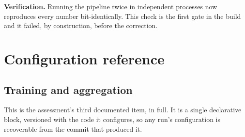 \textbf{Verification.} Running the pipeline twice in independent processes now reproduces every
number bit-identically. This check is the first gate in the build and it failed, by construction,
before the correction.

\section{Configuration reference}
\label{sec:config}

\subsection{Training and aggregation}

This is the assessment's third documented item, in full. It is a single declarative block, versioned
with the code it configures, so any run's configuration is recoverable from the commit that produced
it.

